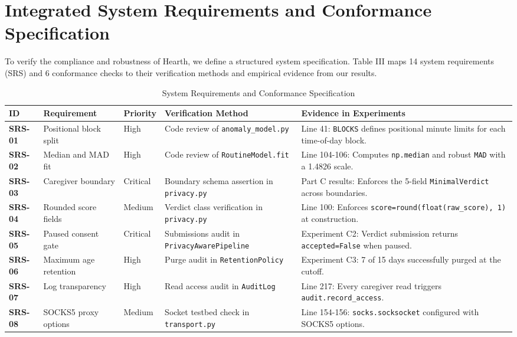 \documentclass[conference]{IEEEtran}
\begin{document}
\section{Integrated System Requirements and Conformance Specification}

To verify the compliance and robustness of Hearth, we define a structured system specification. Table III maps 14 system requirements (SRS) and 6 conformance checks to their verification methods and empirical evidence from our results.

\begin{table}[htbp]
\centering
\caption{System Requirements and Conformance Specification}
\begin{tabular}{lp{2.4cm}lp{4.2cm}p{4.2cm}}
\toprule
ID & Requirement & Priority & Verification Method & Evidence in Experiments \\
\midrule
\textbf{SRS-01} & Positional block split & High & Code review of \texttt{anomaly\_model.py} & Line 41: \texttt{BLOCKS} defines positional minute limits for each time-of-day block. \\
\textbf{SRS-02} & Median and MAD fit & High & Code review of \texttt{RoutineModel.fit} & Line 104-106: Computes \texttt{np.median} and robust \texttt{MAD} with a 1.4826 scale. \\
\textbf{SRS-03} & Caregiver boundary & Critical & Boundary schema assertion in \texttt{privacy.py} & Part C results: Enforces the 5-field \texttt{MinimalVerdict} across boundaries. \\
\textbf{SRS-04} & Rounded score fields & Medium & Verdict class verification in \texttt{privacy.py} & Line 100: Enforces \texttt{score=round(float(raw\_score), 1)} at construction. \\
\textbf{SRS-05} & Paused consent gate & Critical & Submissions audit in \texttt{PrivacyAwarePipeline} & Experiment C2: Verdict submission returns \texttt{accepted=False} when paused. \\
\textbf{SRS-06} & Maximum age retention & High & Purge audit in \texttt{RetentionPolicy} & Experiment C3: 7 of 15 days successfully purged at the cutoff. \\
\textbf{SRS-07} & Log transparency & High & Read access audit in \texttt{AuditLog} & Line 217: Every caregiver read triggers \texttt{audit.record\_access}. \\
\textbf{SRS-08} & SOCKS5 proxy options & Medium & Socket testbed check in \texttt{transport.py} & Line 154-156: \texttt{socks.socksocket} configured with SOCKS5 options. \\

\end{tabular}
\end{table}
\end{document}
